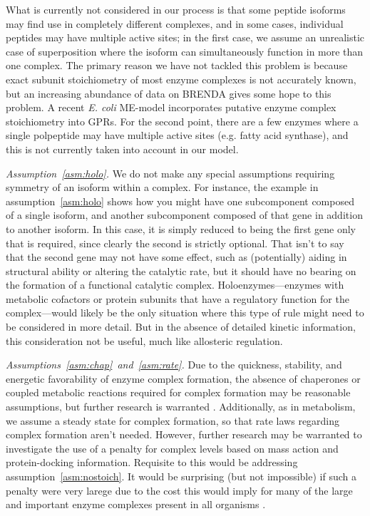What is currently not considered in our
process is that some peptide isoforms may find use in completely
different complexes, and in some cases, individual peptides may
have multiple active sites; in the first case, we assume an unrealistic case of
superposition where the isoform can simultaneously function in more
than one complex. The primary reason we have not tackled this problem
is because exact subunit stoichiometry of most enzyme complexes is not
accurately known, but an increasing abundance of data on BRENDA
\citep{Schomburg2013} gives some hope to this problem. A recent
\emph{E. coli} ME-model \citep{O'Brien2013} incorporates putative enzyme
complex stoichiometry into GPRs. For the second point, there are a
few enzymes where a single polpeptide may have multiple active sites
(e.g. fatty acid synthase), and this is not currently taken into 
account in our model. 

\emph{Assumption~\ref{asm:holo}.}
We do not make any special assumptions requiring symmetry of an isoform
within a complex. For instance, the example in
assumption~\ref{asm:holo} shows how you might have one
subcomponent composed of a single isoform, and another subcomponent
composed of that gene in addition to another isoform. In this case, it
is simply reduced to being the first gene only that is required, since
clearly the second is strictly optional. That isn't to say that the
second gene may not have some effect, such as (potentially) aiding in
structural ability or altering the catalytic rate, but it should have
no bearing on the formation of a functional catalytic
complex. Holoenzymes---enzymes with metabolic cofactors or protein
subunits that have a regulatory function for the complex---would
likely be the only situation where this type of rule might need to be
considered in more detail. But in the absence of detailed kinetic
information, this consideration not be useful, much like allosteric
regulation.

\emph{Assumptions~\ref{asm:chap}~and~\ref{asm:rate}.}
Due to the quickness, stability, and energetic favorability of enzyme
complex formation, the absence of chaperones or coupled metabolic
reactions required for complex formation may be reasonable
assumptions, but further research is warranted \citep{Karr2012}.
Additionally, as in metabolism, we assume a steady state for complex
formation, so that rate laws regarding complex formation aren't
needed. However, further research may be warranted to investigate the
use of a penalty for complex levels based on mass action and
protein-docking information. Requisite to this would be addressing
assumption~\ref{asm:nostoich}. It would be surprising (but not
impossible) if such a penalty were very larege due to the cost this
would imply for many of the large and important enzyme complexes
present in all organisms \citep{Nelson2008}.

